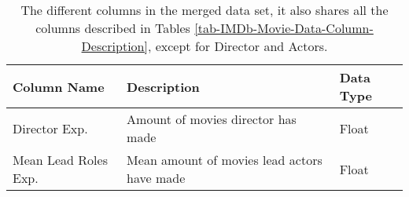    \begin{table}[H]
        \centering
        \begin{tabular}{lp{9cm}l}
            \toprule
            Column Name          & Description                                 & Data Type \\
            \midrule
            Director Exp.        & Amount of movies director has made          & Float     \\
            Mean Lead Roles Exp. & Mean amount of movies lead actors have made & Float     \\
            \bottomrule
        \end{tabular}
        \caption[short]{The different columns in the merged data set,
            it also shares all the columns described in Tables
            \ref{tab-IMDb-Movie-Data-Column-Description},
            except for Director and Actors.}\label{tab-merged-data-column-description}
    \end{table}
